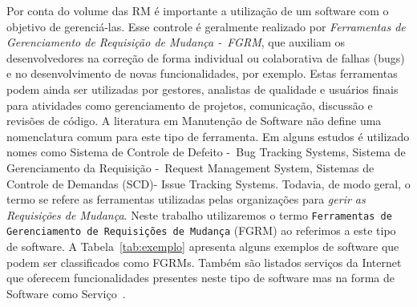 Por conta do volume das RM é importante a utilização de um software com o
objetivo de gerenciá-las. Esse controle é geralmente realizado por
\textit{Ferramentas de Gerenciamento de Requisição de Mudança -~FGRM}, que
auxiliam os desenvolvedores na correção de forma individual ou colaborativa de
falhas (bugs) e no desenvolvimento de novas funcionalidades, por exemplo. Estas
ferramentas podem ainda ser utilizadas por gestores, analistas de qualidade e
usuários finais para atividades como gerenciamento de projetos, comunicação,
discussão e revisões de código. A literatura em Manutenção de Software não
define uma nomenclatura comum para este tipo de ferramenta. Em alguns estudos é
utilizado nomes como Sistema de Controle de Defeito -~Bug Tracking Systems,
Sistema de Gerenciamento da Requisição -~Request Management System, Sistemas de
Controle de Demandas (SCD)- Issue Tracking Systems. Todavia, de modo geral, o
termo se refere as ferramentas utilizadas pelas organizações para \textit{gerir
    as Requisições de Mudança}. Neste trabalho utilizaremos o termo
\texttt{Ferramentas de Gerenciamento de Requisições de Mudança} (FGRM) ao
referimos a este tipo de software. A Tabela~\ref{tab:exemplo} apresenta alguns
exemplos de software que podem ser classificados como FGRMs. Também são listados
serviços da Internet que oferecem funcionalidades presentes neste tipo de
software mas na forma de Software como Serviço~\cite{fox2013engineering}.

\begin{table}[htpb]
\centering
{}
\caption{Exemplos de ferramentas e serviços da Internet. Adaptado
		de~\cite{cavalcanti2014challenges}}
\label{tab:exemplo}
\end{table}

